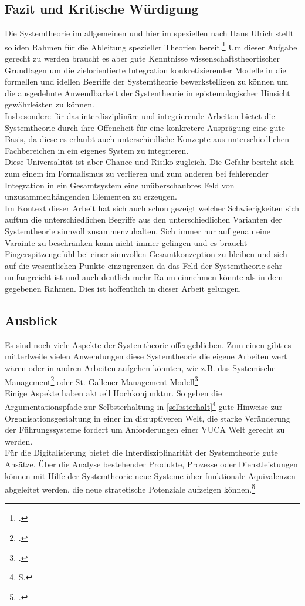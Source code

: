 \documentclass[a4paper,12pt]{article}
\begin{document}
\subsection{Fazit und Kritische Würdigung}
Die Systemtheorie im allgemeinen und hier im speziellen nach Hans Ulrich stellt soliden Rahmen für die Ableitung spezieller Theorien bereit.\footcite[S. 24]{Oelsnitz1994} Um dieser Aufgabe gerecht zu werden braucht es aber gute Kenntnisse wissenschaftstheortischer Grundlagen um die zielorientierte Integration konkretisierender Modelle in die formellen und idellen Begriffe der Systemtheorie bewerkstelligen zu können um die ausgedehnte Anwendbarkeit der Systentheorie in epistemologischer Hinsicht gewährleisten zu können.\\
Insbesondere für das interdisziplinäre und integrierende Arbeiten bietet die Systemtheorie durch ihre Offeneheit für eine konkretere Ausprägung eine gute Basis, da diese es erlaubt auch unterschiedliche Konzepte aus unterschiedlichen Fachbereichen in ein eigenes System zu integrieren.\\
Diese Universalität ist aber Chance und Risiko zugleich. Die Gefahr besteht sich zum einem im Formalismus zu verlieren und zum anderen bei fehlerender Integration in ein Gesamtsystem eine unüberschaubres Feld von unzusammenhängenden Elementen zu erzeugen.\\
Im Kontext dieser Arbeit hat sich auch schon gezeigt welcher Schwierigkeiten sich auftun die unterschiedlichen Begriffe aus den unterschiedlichen Varianten der Systemtheorie sinnvoll zusammenzuhalten. Sich immer nur auf genau eine Varainte zu beschränken kann nicht immer gelingen und es braucht Fingerspitzengefühl bei einer sinnvollen Gesamtkonzeption zu bleiben und sich auf die wesentlichen Punkte einzugrenzen da das Feld der Systemtheorie sehr umfangreicht ist und auch deutlich mehr Raum einnehmen könnte als in dem gegebenen Rahmen. Dies ist hoffentlich in dieser Arbeit gelungen.

\subsection{Ausblick}
Es sind noch viele Aspekte der Systemtheorie offengeblieben. Zum einen gibt es mitterlweile vielen Anwendungen diese Systemtheorie die eigene Arbeiten wert wären oder in andren Arbeiten aufgehen könnten, wie z.B. das Systemische Management\footcite{Malik2009} oder St. Gallener Management-Modell\footcite{RueeggStuerm2020}\\
Einige Aspekte haben aktuell Hochkonjunktur. So geben die Argumentationspfade zur Selbsterhaltung in \ref{selbsterhalt}\footnote{S. \pageref{selbsterhalt}} gute Hinweise zur Organisationsgestaltung in einer im disruptiveren Welt, die starke Veränderung der Führungssysteme fordert um Anforderungen einer VUCA Welt gerecht zu werden.\\
Für die Digitalisierung bietet die Interdisziplinarität der Systemtheorie gute Ansätze. Über die Analyse bestehender Produkte, Prozesse oder Dienstleistungen können mit Hilfe der Systemtheorie neue Systeme über funktionale Äquivalenzen abgeleitet werden, die neue stratetische Potenziale aufzeigen können.\footcite[S. 65]{Hartmann2018}


\newpage


\printbibliography
% 
% 
\end{document}
